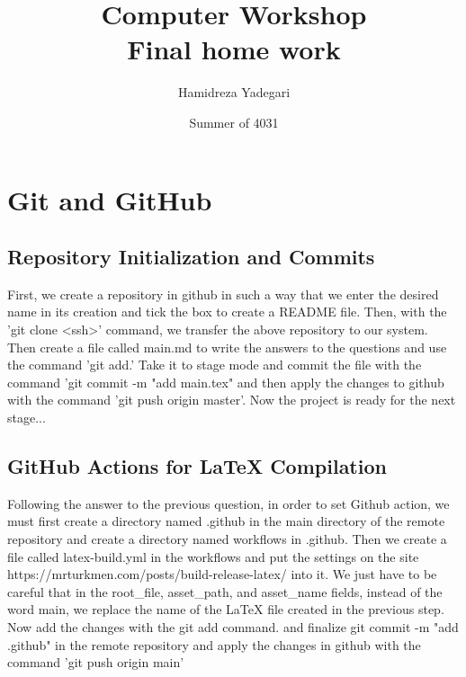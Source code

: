 \documentclass{article}
\title{Computer Workshop \\ Final home work}
\author{Hamidreza Yadegari}
\date{Summer of 4031}
\begin{document}
   \maketitle 

    \newpage
    
    \section{Git and GitHub}
        \subsection{Repository Initialization and Commits}
            First, we create a repository in github in such a way 
            that we enter the desired name in its creation and tick
             the box to create a README file. Then, with the 'git clone
              <ssh>' command, we transfer the above repository to our 
              system. Then create a file called main.md to write the 
              answers to the questions and use the command 'git add.'  
              Take it to stage mode and commit the file with the command
               'git commit -m "add main.tex" and then apply the changes to 
               github with the command 'git push origin master'. Now the 
               project is ready for the next stage...

        
        \subsection{GitHub Actions for LaTeX Compilation}
        Following the answer to the previous question, in order to set Github
         action, we must first create a directory named .github in the main 
         directory of the remote repository and create a directory named workflows
          in .github. Then we create a file called latex-build.yml in the workflows
           and put the settings on the site https://mrturkmen.com/posts/build-release-latex/
            into it. We just have to be careful that in the root_file, asset_path, and asset_name
             fields, instead of the word main, we replace the name of the LaTeX file 
             created in the previous step. Now add the changes with the git add command.
              and finalize git commit -m "add .github" in the remote repository and apply
               the changes in github with the command 'git push origin main'
\end{document}
